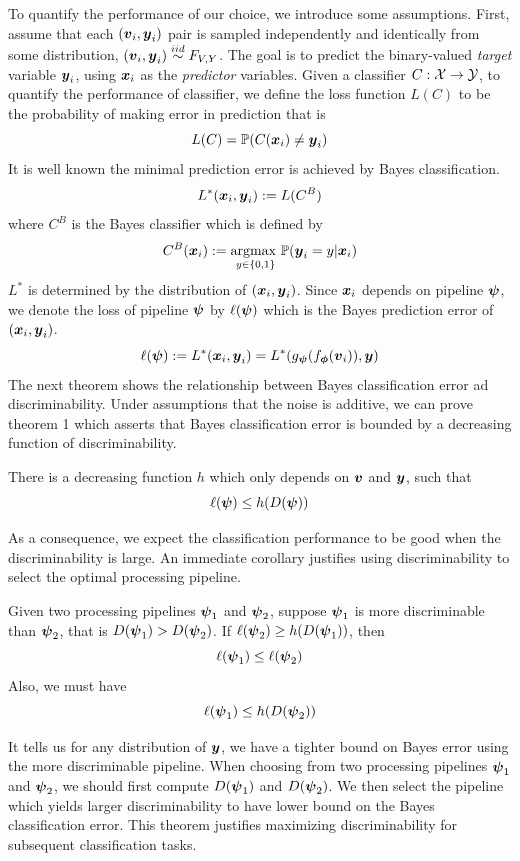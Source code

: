 \documentclass{article}
\begin{document}
To quantify the performance of our choice, we introduce some assumptions.  First, assume that each $(\boldsymbol{v}_i,\boldsymbol{y}_i)$ pair is sampled independently and identically from some distribution, $(\boldsymbol{v}_i,\boldsymbol{y}_i) \overset{iid}{\sim} F_{V,Y}$. The goal is to predict the binary-valued \emph{target} variable $\boldsymbol{y}_i$,  using $\boldsymbol{x}_i$ as the \emph{predictor} variables. Given a classifier $C: \mathcal{X} \rightarrow \mathcal{Y}$, to quantify the performance of classifier, we define the loss function $L(C)$ to be the probability of making error in prediction that is
\[L(C) = \mathbb{P}(C(\boldsymbol{x}_i) \neq \boldsymbol{y}_i) \]
It is well known the minimal prediction error is achieved by Bayes classification.
\[L^*(\boldsymbol{x}_i,\boldsymbol{y}_i) : = L(C^B)\]
where $C^{B}$ is the Bayes classifier which is defined by
\[C^{B}(\boldsymbol{x}_i):= \underset{y \in \{0,1\} }{\text{argmax }} \mathbb{P}(\boldsymbol{y}_i=y|\boldsymbol{x}_i)\] 
$L^*$ is determined by the distribution of $(\boldsymbol{x}_i, \boldsymbol{y}_i)$. Since $\boldsymbol{x}_i$ depends on pipeline $\boldsymbol{\psi}$, we denote the loss of pipeline $\boldsymbol{\psi}$ by $\ell(\boldsymbol{\psi})$ which is the Bayes prediction error of $(\boldsymbol{x}_i, \boldsymbol{y}_i)$.
\[\ell(\boldsymbol{\psi}):= L^*(\boldsymbol{x}_i,\boldsymbol{y}_i) = L^*(g_{\boldsymbol{\psi}} (f_{\boldsymbol{\phi}} (\boldsymbol{v}_i) ),\boldsymbol{y}) \] 
The next theorem shows the relationship between Bayes classification error ad discriminability. Under assumptions that the noise is additive, we can prove theorem 1 which asserts that Bayes classification error is bounded by a decreasing function of discriminability. 
\begin{thm}	
	There is a decreasing function $h$ which only depends on $\boldsymbol{v}$ and $\boldsymbol{y}$, such that
	\[\ell(\boldsymbol{\psi}) \leq h(D(\boldsymbol{\psi})) \]
\end{thm}
As a consequence, we expect the classification performance to be good when the discriminability is large. An immediate corollary justifies using discriminability to select the optimal processing pipeline. 
\begin{coro}	
	Given two processing pipelines $\boldsymbol{\psi}_1$ and $\boldsymbol{\psi}_2$, suppose $\boldsymbol{\psi}_1$ is more discriminable than $\boldsymbol{\psi}_2$, that is $D(\boldsymbol{\psi}_1) > D(\boldsymbol{\psi}_2)$. If $\ell(\boldsymbol{\psi}_2) \geq h(D(\boldsymbol{\psi}_1))$, then
	\[ \ell(\boldsymbol{\psi}_1) \leq \ell(\boldsymbol{\psi}_2) \] 
	Also, we must have
	\[ \ell(\boldsymbol{\psi}_1) \leq h(D(\boldsymbol{\psi}_2)) \]
	
\end{coro}
It tells us for any distribution of $\boldsymbol{y}$, we have a tighter bound on Bayes error using the more discriminable pipeline. When choosing from two processing pipelines $\boldsymbol{\psi}_1$ and $\boldsymbol{\psi}_2$, we should first compute $D(\boldsymbol{\psi}_1)$ and $D(\boldsymbol{\psi}_2)$. We then select the pipeline which yields larger discriminability to have lower bound on the Bayes classification error. This theorem justifies maximizing discriminability for subsequent classification tasks.
\end{document}
